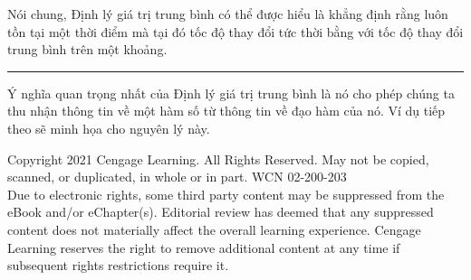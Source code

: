 \begin{minipage}[t]{0.68\textwidth}
  \vspace{8pt}
  \noindent
  Nói chung, Định lý giá trị trung bình có thể được hiểu là khẳng định rằng luôn tồn tại một thời điểm mà tại đó tốc độ thay đổi tức thời bằng với tốc độ thay đổi trung bình trên một khoảng.\hfill\textcolor{stewartblue}{\rule{1.1ex}{1.1ex}}

  \vspace{12pt}
  \noindent
  Ý nghĩa quan trọng nhất của Định lý giá trị trung bình là nó cho phép chúng ta thu nhận thông tin về một hàm số từ thông tin về đạo hàm của nó. Ví dụ tiếp theo sẽ minh họa cho nguyên lý này.
\end{minipage}

\vfill
\noindent
{\fontsize{6.5pt}{8pt}\selectfont\color{black!70}
\begin{center}
Copyright 2021 Cengage Learning. All Rights Reserved. May not be copied, scanned, or duplicated, in whole or in part. WCN 02-200-203\\[1.5pt]
Due to electronic rights, some third party content may be suppressed from the eBook and/or eChapter(s). Editorial review has deemed that any suppressed content does not materially affect the overall learning experience. Cengage Learning reserves the right to remove additional content at any time if subsequent rights restrictions require it.
\end{center}}
